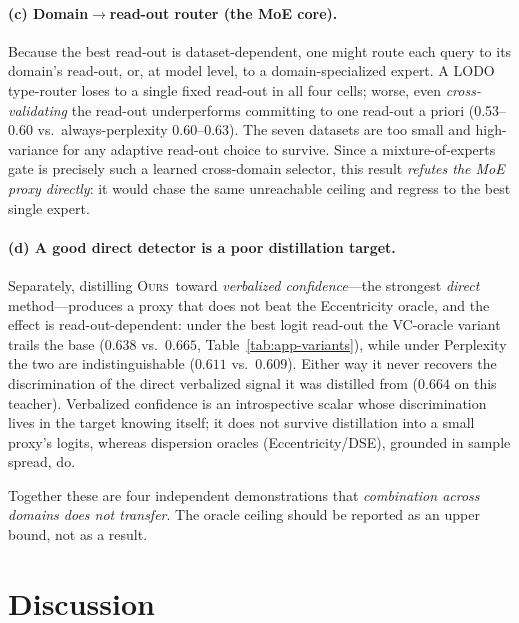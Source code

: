 \documentclass[11pt]{article}
\newcommand{\ours}{\textsc{Ours}}
\begin{document}
\paragraph{(c) Domain$\to$read-out router (the MoE core).} Because the best read-out is
dataset-dependent, one might route each query to its domain's read-out, or, at model
level, to a domain-specialized expert. A LODO type-router loses to a single fixed
read-out in all four cells; worse, even \emph{cross-validating} the read-out
underperforms committing to one read-out a priori (0.53--0.60 vs.\ always-perplexity
0.60--0.63). The seven datasets are too small and high-variance for any adaptive
read-out choice to survive. Since a mixture-of-experts gate is precisely such a learned
cross-domain selector, this result \emph{refutes the MoE proxy directly}: it would chase
the same unreachable ceiling and regress to the best single expert.

\paragraph{(d) A good direct detector is a poor distillation target.} Separately,
distilling \ours\ toward \emph{verbalized confidence}---the strongest \emph{direct}
method---produces a proxy that does not beat the Eccentricity oracle, and the effect is
read-out-dependent: under the best logit read-out the VC-oracle variant trails the base
($0.638$ vs.\ $0.665$, Table~\ref{tab:app-variants}), while under Perplexity the two are
indistinguishable ($0.611$ vs.\ $0.609$). Either way it never recovers the discrimination of the
direct verbalized signal it was distilled from ($0.664$ on this teacher). Verbalized
confidence is an introspective scalar whose discrimination lives in the target knowing
itself; it does not survive distillation into a small proxy's logits, whereas
dispersion oracles (Eccentricity/DSE), grounded in sample spread, do.

Together these are four independent demonstrations that \emph{combination across
domains does not transfer}. The oracle ceiling should be reported as an upper bound, not
as a result.

\section{Discussion}\label{sec:discussion}
\end{document}

